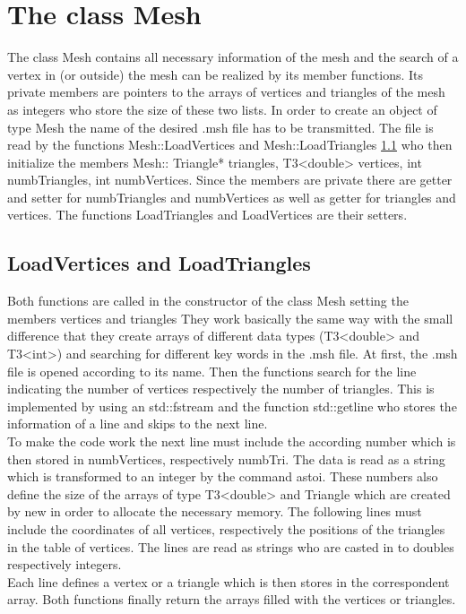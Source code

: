 \documentclass[10pt]{article}
\begin{document}
\section{The class Mesh} \label{mesh}
The class Mesh contains all necessary information of the mesh and the search of a vertex in (or outside) the mesh can be realized by its member functions. Its private members are pointers to the arrays of vertices and triangles of the mesh as integers who store the size of these two lists.
In order to create an object of type Mesh the name of the desired .msh file has to be transmitted. The file is read by the functions {\ttfamily Mesh::LoadVertices} and {\ttfamily Mesh::LoadTriangles} \ref{Load} who then initialize the members {\ttfamily Mesh:: Triangle* triangles, T3<double> vertices, int numbTriangles, int numbVertices}.
Since the members are private there are getter and setter for {\ttfamily numbTriangles} and {\ttfamily numbVertices} as well as getter for {\ttfamily triangles} and {\ttfamily vertices}. The functions {\ttfamily LoadTriangles} and {\ttfamily LoadVertices} are their setters. \\


\subsection{LoadVertices and LoadTriangles} \label{Load}
Both functions are called in the constructor of the class {\ttfamily Mesh} setting the members {\ttfamily vertices} and {\ttfamily triangles}
They work basically the same way with the small difference that they create arrays of different data types ({\ttfamily T3<double>} and {\ttfamily T3<int>}) and searching for different key words in the  .msh file. 
At first, the .msh file is opened according to its name. Then the functions search for the line indicating the number of vertices respectively the number of triangles. This is implemented by using an {\ttfamily std::fstream} and the function {\ttfamily std::getline} who stores the information of a line and skips to the next line. \\
To make the code work the next line must include the according number which is then stored in {\ttfamily numbVertices}, respectively {\ttfamily numbTri}. The data is read as a string which is transformed to an integer by the command {\ttfamily astoi}. These numbers also define the size of the arrays of type {\ttfamily T3<double>} and {\ttfamily Triangle } which are created by {\ttfamily new} in order to allocate the necessary memory. The following lines must include the coordinates of all vertices, respectively the positions of the triangles in the table of vertices. The lines are read as strings who are casted in to {\ttfamily doubles} respectively {\ttfamily integers}. \\
Each line defines a vertex or a triangle which is then stores in the correspondent array.
Both functions finally return the arrays filled with the vertices or triangles.
\end{document}

